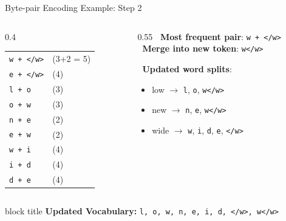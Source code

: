 \documentclass[aspectratio=169,xcolor=dvipsnames,svgnames,x11names,fleqn]{beamer}
\begin{document}
\begin{frame}{Byte-pair Encoding Example: Step 2}
    \begin{columns}
        \begin{column}{0.4\textwidth}
            \begin{tcolorbox}[colback=gray!10, colframe=gray!50, title=\scriptsize Merge (Most Frequent Pair)]
                \scriptsize
                \begin{tabular}{ll}
                    \texttt{w + </w>} & (3+2 = 5) \\
                    \texttt{e + </w>} & (4) \\
                    \texttt{l + o}    & (3) \\
                    \texttt{o + w}    & (3) \\
                    \texttt{n + e}    & (2) \\
                    \texttt{e + w}    & (2) \\
                    \texttt{w + i}    & (4) \\
                    \texttt{i + d}    & (4) \\
                    \texttt{d + e}    & (4)
                \end{tabular}
            \end{tcolorbox}
        \end{column}
        \begin{column}{0.55\textwidth}
            \textbf{\faPlusCircle \ Most frequent pair}: \textcolor{mergecolor}{\texttt{w + </w>}} \\
            \textbf{\faCogs \ Merge into new token}: \textcolor{mergecolor}{\texttt{w</w>}}
            
            \vspace{0.5em}
            \textbf{\faSync \ Updated word splits}:
            \begin{itemize}
                \item \scriptsize low $\rightarrow$ \texttt{l}, \texttt{o}, \textcolor{mergecolor}{\texttt{w</w>}}
                \item \scriptsize new $\rightarrow$ \texttt{n}, \texttt{e}, \textcolor{mergecolor}{\texttt{w</w>}}
                \item \scriptsize wide $\rightarrow$ \texttt{w}, \texttt{i}, \texttt{d}, \texttt{e}, \texttt{</w>}
            \end{itemize}
        \end{column}
    \end{columns}
    \vfill
    \begin{beamercolorbox}[wd=\textwidth, sep=3pt, rounded=true]{block title}
        \scriptsize \textbf{Updated Vocabulary:} \textcolor{contextGold}{\texttt{l, o, w, n, e, i, d, </w>, w</w>}}
    \end{beamercolorbox}
\end{frame}
\end{document}
